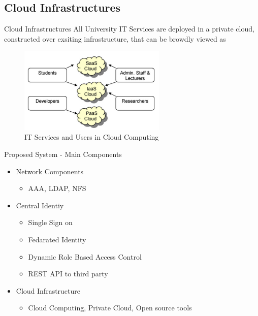 \documentclass[xcolor=dvipsnames]{beamer}
\begin{document}
\subsection{Cloud Infrastructures}
\begin{frame}{Cloud Infrastructures}
All University IT Services are deployed in a private cloud, constructed over exsiting infrastructure, that can be browdly viewed as 
	
\begin{figure}[H]
\begin{center}
\includegraphics[width=7cm]{./it2.png}
\caption{ IT Services and Users in Cloud Computing\label{fig:IT Services and Users in Cloud Computing }}
\end{center}
\end{figure}	
	
	
\end{frame}

\begin{frame}{Proposed System -  Main Components}
\begin{itemize}
	
	\item Network Components 
	\begin{itemize}
		\item AAA, LDAP, NFS
	\end{itemize}
	\item Central Identiy 
	\begin{itemize}
		\item Single Sign on
		\item Fedarated Identity
		\item Dynamic Role Based Access Control
		\item REST API to third party
	\end{itemize}
	\item Cloud Infrastructure
	\begin{itemize}
		\item Cloud Computing, Private Cloud, Open source tools
	\end{itemize}
\end{itemize}
\end{frame}
\end{document}
